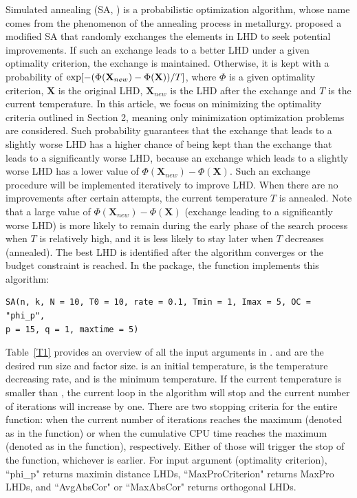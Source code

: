 Simulated annealing (SA, \cite{kirkpatrick1983optimization}) is a probabilistic optimization algorithm, whose name comes from the phenomenon of the annealing process in metallurgy. \cite{morris1995exploratory} proposed a modified SA that randomly exchanges the elements in LHD to seek potential improvements. If such an exchange leads to a better LHD under a given optimality criterion, the exchange is maintained. Otherwise, it is kept with a probability of $\hbox{exp}[-(\Phi(\textbf{X}_{new})-\Phi(\textbf{X}))/T]$, where $\Phi$ is a given optimality criterion, $\textbf{X}$ is the original LHD,  $\textbf{X}_{new}$ is the LHD after the exchange and $T$ is the current temperature. In this article, we focus on minimizing the optimality criteria outlined in Section 2, meaning only minimization optimization problems are considered. Such probability guarantees that the exchange that leads to a slightly worse LHD has a higher chance of being kept than the exchange that leads to a significantly worse LHD, because an exchange which leads to a slightly worse LHD has a lower value of $\Phi(\textbf{X}_{new})-\Phi(\textbf{X})$. Such an exchange procedure will be implemented iteratively to improve LHD. When there are no improvements after certain attempts, the current temperature $T$ is annealed. Note that a large value of $\Phi(\textbf{X}_{new})-\Phi(\textbf{X})$ (exchange leading to a significantly worse LHD) is more likely to remain during the early phase of the search process when $T$ is relatively high, and it is less likely to stay later when $T$ decreases (annealed). The best LHD is identified after the algorithm converges or the budget constraint is reached. In the  package, the function  implements this algorithm:
\begin{verbatim}
SA(n, k, N = 10, T0 = 10, rate = 0.1, Tmin = 1, Imax = 5, OC = "phi_p",
p = 15, q = 1, maxtime = 5)
\end{verbatim}

Table~\ref{T1} provides an overview of all the input arguments in .  and  are the desired run size and factor size.  is an initial temperature,  is the temperature decreasing rate, and  is the minimum temperature. If the current temperature is smaller than , the current loop in the algorithm will stop and the current number of iterations will increase by one. There are two stopping criteria for the entire function: when the current number of iterations reaches the maximum (denoted as  in the function) or when the cumulative CPU time reaches the maximum (denoted as  in the function), respectively. Either of those will trigger the stop of the function, whichever is earlier. For input argument  (optimality criterion), ``phi\_p" returns maximin distance LHDs, ``MaxProCriterion" returns MaxPro LHDs, and ``AvgAbsCor" or ``MaxAbsCor" returns orthogonal LHDs.

